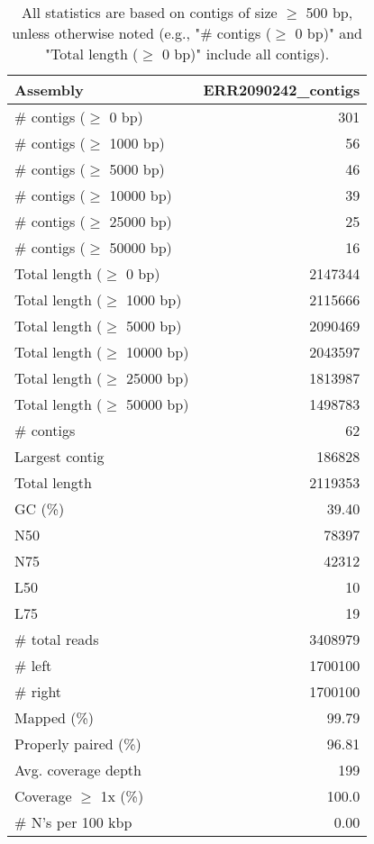 \documentclass[12pt,a4paper]{article}
\begin{document}
\begin{table}[ht]
\begin{center}
\caption{All statistics are based on contigs of size $\geq$ 500 bp, unless otherwise noted (e.g., "\# contigs ($\geq$ 0 bp)" and "Total length ($\geq$ 0 bp)" include all contigs).}
\begin{tabular}{|l*{1}{|r}|}
\hline
Assembly & ERR2090242\_contigs \\ \hline
\# contigs ($\geq$ 0 bp) & 301 \\ \hline
\# contigs ($\geq$ 1000 bp) & 56 \\ \hline
\# contigs ($\geq$ 5000 bp) & 46 \\ \hline
\# contigs ($\geq$ 10000 bp) & 39 \\ \hline
\# contigs ($\geq$ 25000 bp) & 25 \\ \hline
\# contigs ($\geq$ 50000 bp) & 16 \\ \hline
Total length ($\geq$ 0 bp) & 2147344 \\ \hline
Total length ($\geq$ 1000 bp) & 2115666 \\ \hline
Total length ($\geq$ 5000 bp) & 2090469 \\ \hline
Total length ($\geq$ 10000 bp) & 2043597 \\ \hline
Total length ($\geq$ 25000 bp) & 1813987 \\ \hline
Total length ($\geq$ 50000 bp) & 1498783 \\ \hline
\# contigs & 62 \\ \hline
Largest contig & 186828 \\ \hline
Total length & 2119353 \\ \hline
GC (\%) & 39.40 \\ \hline
N50 & 78397 \\ \hline
N75 & 42312 \\ \hline
L50 & 10 \\ \hline
L75 & 19 \\ \hline
\# total reads & 3408979 \\ \hline
\# left & 1700100 \\ \hline
\# right & 1700100 \\ \hline
Mapped (\%) & 99.79 \\ \hline
Properly paired (\%) & 96.81 \\ \hline
Avg. coverage depth & 199 \\ \hline
Coverage $\geq$ 1x (\%) & 100.0 \\ \hline
\# N's per 100 kbp & 0.00 \\ \hline
\end{tabular}
\end{center}
\end{table}
\end{document}
